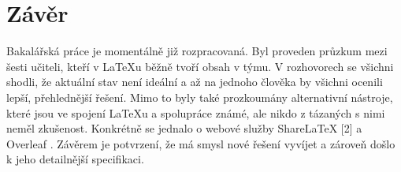 \documentclass{article}
\begin{document}
\section{Závěr}
Bakalářská práce je momentálně již rozpracovaná. Byl proveden průzkum mezi šesti učiteli, kteří v LaTeXu běžně tvoří obsah v týmu. V rozhovorech se všichni shodli, že aktuální stav není ideální a až na jednoho člověka by všichni ocenili lepší, přehlednější řešení. Mimo to byly také prozkoumány alternativní nástroje, které jsou ve spojení LaTeXu a spolupráce známé, ale nikdo z tázaných s nimi neměl zkušenost. Konkrétně se jednalo o webové služby ShareLaTeX [2] a Overleaf \citep{cit4}. Závěrem je potvrzení, že má smysl nové řešení vyvíjet a zároveň došlo k jeho detailnější specifikaci.



\end{document}
